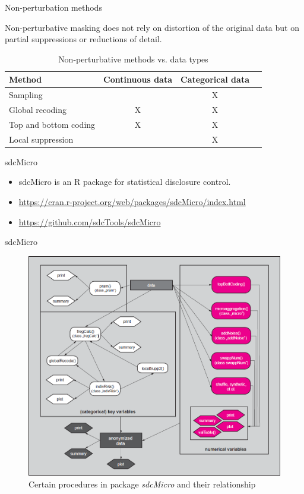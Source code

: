 \documentclass[
	aspectratio = 169
 ]{beamer}
\begin{document}
\begin{frame}{Non-perturbation methods}

Non-perturbative masking does not rely on distortion of the original
data but on partial suppressions or reductions of detail.

\begin{table}[ht]   
\centering  
\begin{tabular}[t]{lccc}    
\toprule    
 Method & Continuous data & Categorical data&\\ 
\midrule    
 Sampling  & & X &\\    
 Global recoding & X & X &\\    
 Top and bottom coding& X & X &\\   
 Local suppression & & X &\\    
\bottomrule 
\end{tabular}   
\caption{Non-perturbative methods vs. data types}   
\end{table}
\end{frame}

\begin{frame}{sdcMicro}

\begin{itemize}
\item
  sdcMicro is an R package for statistical disclosure control.
\item
  \url{https://cran.r-project.org/web/packages/sdcMicro/index.html}
\item
  \url{https://github.com/sdcTools/sdcMicro}
\end{itemize}
\end{frame}

\begin{frame}{sdcMicro}

\begin{figure}
    \centering
    \includegraphics[width=0.5\linewidth
                    ]{Presentation//gallery/sdcMicro.png}
    \caption{Certain procedures in package \emph{sdcMicro} and their
relationship}
\end{figure}

\end{frame}
\end{document}

